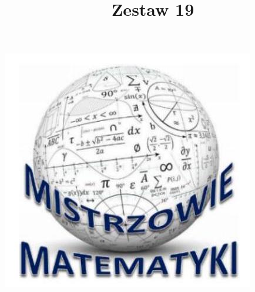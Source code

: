 \documentclass[10pt]{article}
\title{Zestaw 19 }
\author{}
\date{}
\begin{document}
\maketitle
\begin{center}
\includegraphics[max width=\textwidth]{2024_11_21_1c9a743c22bda6d33a9bg-1}
\end{center}
\end{document}
